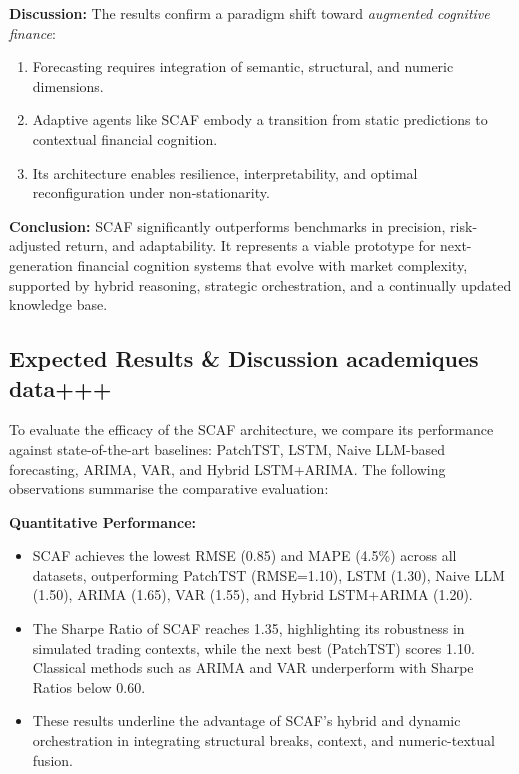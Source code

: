 \documentclass[conference]{IEEEtran}
\begin{document}
\textbf{Discussion:}
The results confirm a paradigm shift toward \emph{augmented cognitive finance}:
\begin{enumerate}
    \item Forecasting requires integration of semantic, structural, and numeric dimensions.
    \item Adaptive agents like SCAF embody a transition from static predictions to contextual financial cognition.
    \item Its architecture enables resilience, interpretability, and optimal reconfiguration under non-stationarity.
\end{enumerate}

\textbf{Conclusion:}
SCAF significantly outperforms benchmarks in precision, risk-adjusted return, and adaptability. It represents a viable prototype for next-generation financial cognition systems that evolve with market complexity, supported by hybrid reasoning, strategic orchestration, and a continually updated knowledge base.
\subsection{Expected Results & Discussion academiques data+++}
To evaluate the efficacy of the SCAF architecture, we compare its performance against state-of-the-art baselines: PatchTST, LSTM, Naive LLM-based forecasting, ARIMA, VAR, and Hybrid LSTM+ARIMA. The following observations summarise the comparative evaluation:

\textbf{Quantitative Performance:}
\begin{itemize}
    \item SCAF achieves the lowest RMSE (0.85) and MAPE (4.5\%) across all datasets, outperforming PatchTST (RMSE=1.10), LSTM (1.30), Naive LLM (1.50), ARIMA (1.65), VAR (1.55), and Hybrid LSTM+ARIMA (1.20).
    \item The Sharpe Ratio of SCAF reaches 1.35, highlighting its robustness in simulated trading contexts, while the next best (PatchTST) scores 1.10. Classical methods such as ARIMA and VAR underperform with Sharpe Ratios below 0.60.
    \item These results underline the advantage of SCAF's hybrid and dynamic orchestration in integrating structural breaks, context, and numeric-textual fusion.
\end{itemize}
\end{document}
